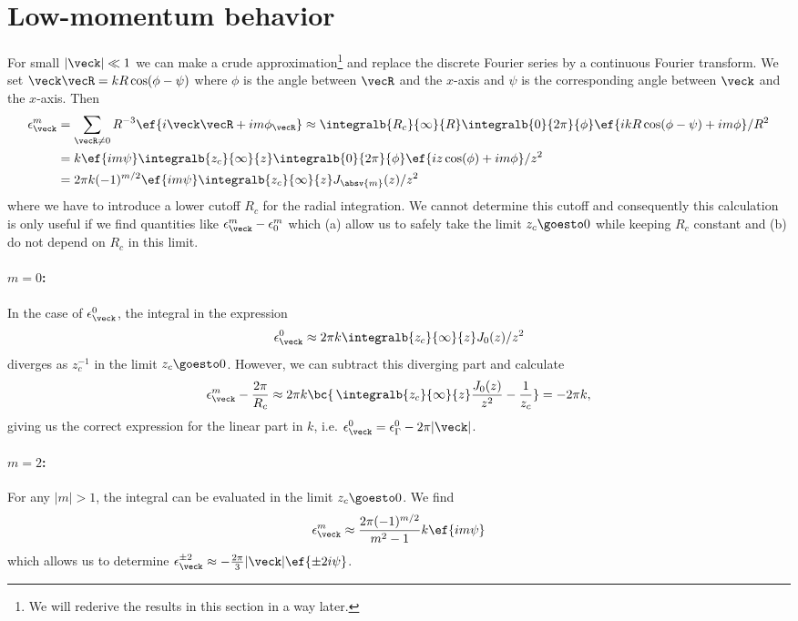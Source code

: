 \section{Low-momentum behavior}
For small $|\veck| \ll 1$ we can make a crude approximation\footnote{We will rederive the results in this section in a  way later.} and replace the discrete Fourier series
by a continuous Fourier transform. We set $\veck\vecR = k R \cos(\phi-\psi)$ where
$\phi$ is the angle between $\vecR$ and the $x$-axis and $\psi$ is the
corresponding angle between $\veck$ and the $x$-axis. Then
\begin{align}
    \epskm &= \sum_{\vecR\ne 0} R^{-3} \ef{i\veck\vecR+i m \phi_\vecR}
    \approx \integralb{R_c}{\infty}{R} \integralb{0}{2\pi}{\phi} \ef{ikR \cos(\phi-\psi) + i m \phi} / R^2\\
    &= k \ef{im \psi} \integralb{z_c}{\infty}{z} \integralb{0}{2\pi}{\phi} \ef{i z \cos(\phi) + i m \phi} / z^2\\
    &= 2\pi k (-1)^{m/2} \ef{i m \psi} \integralb{z_c}{\infty}{z} J_{\absv{m}}(z)/z^2
\end{align}
where we have to introduce a lower cutoff $R_c$ for the radial integration.
We cannot determine this cutoff and consequently this calculation is only useful
if we find quantities like $\epsilon_{\veck}^m-\epsilon^m_0$ which (a) allow
us to safely take the limit $z_c \goesto 0$ while keeping $R_c$ constant and
(b) do not depend on $R_c$ in this limit.

\paragraph{$m=0$:} In the case of $\epsk^0$, the integral in the expression
\begin{align}
    \epsk^0 \approx 2\pi k \integralb{z_c}{\infty}{z} J_0(z)/z^2
\end{align}
diverges as $z_c^{-1}$ in the limit $z_c \goesto 0$. However, we can subtract this diverging part and calculate
\begin{align}
    \epskm - \frac{2\pi}{R_c} \approx 2\pi k \bc{ \, \integralb{z_c}{\infty}{z} \frac{J_0(z)}{z^2} - \frac{1}{z_c} } = -2\pi k,
\end{align}
giving us the correct expression for the linear part in $k$, i.e. $\epsk^0=\eps_\Gamma^0 - 2\pi |\veck|$.

\paragraph{$m=2$:} For any $|m|>1$, the integral can be evaluated in the limit $z_c\goesto 0$. We find
\begin{align}
    \epsilon^m_{\veck} \approx \frac{2\pi (-1)^{m/2}}{m^2-1} k \ef{im \psi}
\end{align}
which allows us to determine $\epsilon^{\pm 2}_{\veck} \approx -\frac{2\pi}{3} |\veck| \ef{\pm 2 i \psi}$.

